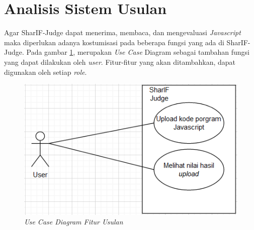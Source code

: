 \section{Analisis Sistem Usulan}
\label{sec: Analisis Sistem Usulan}
Agar SharIF-Judge dapat menerima, membaca, dan mengevaluasi \textit{Javascript} maka diperlukan adanya kostumisasi pada beberapa fungsi yang ada di SharIF-Judge. Pada gambar \ref{fig:Usecaseusulan}, merupakan \textit{Use Case} Diagram sebagai tambahan fungsi yang dapat dilakukan oleh \textit{user}. Fitur-fitur yang akan ditambahkan, dapat digunakan oleh setiap \textit{role}. 

\begin{figure}[h!]
     \centering
     \includegraphics[width=0.4\linewidth]{Gambar/Use_Case_Diagram_Usulan.PNG}
     \caption{\textit{Use Case Diagram Fitur Usulan}}
     \label{fig:Usecaseusulan}
 \end{figure}

 
